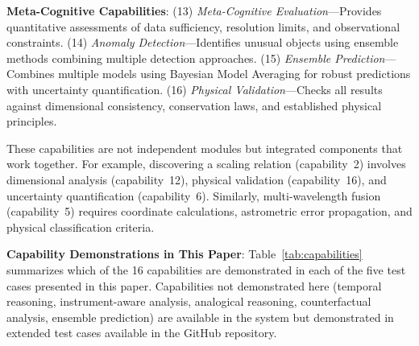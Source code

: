 \documentclass[usenatbib]{rasti}
\begin{document}
\textbf{Meta-Cognitive Capabilities}: (13) \textit{Meta-Cognitive Evaluation}---Provides quantitative assessments of data sufficiency, resolution limits, and observational constraints. (14) \textit{Anomaly Detection}---Identifies unusual objects using ensemble methods combining multiple detection approaches. (15) \textit{Ensemble Prediction}---Combines multiple models using Bayesian Model Averaging for robust predictions with uncertainty quantification. (16) \textit{Physical Validation}---Checks all results against dimensional consistency, conservation laws, and established physical principles.

These capabilities are not independent modules but integrated components that work together. For example, discovering a scaling relation (capability~2) involves dimensional analysis (capability~12), physical validation (capability~16), and uncertainty quantification (capability~6). Similarly, multi-wavelength fusion (capability~5) requires coordinate calculations, astrometric error propagation, and physical classification criteria.

\textbf{Capability Demonstrations in This Paper}: Table~\ref{tab:capabilities} summarizes which of the 16 capabilities are demonstrated in each of the five test cases presented in this paper. Capabilities not demonstrated here (temporal reasoning, instrument-aware analysis, analogical reasoning, counterfactual analysis, ensemble prediction) are available in the system but demonstrated in extended test cases available in the GitHub repository.
\end{document}
